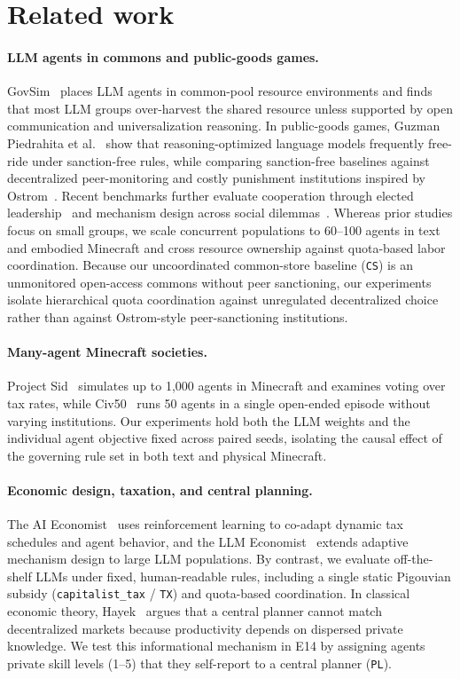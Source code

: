 \documentclass[10pt,letterpaper]{article}
\begin{document}
\section{Related work}

\paragraph{LLM agents in commons and public-goods games.}
GovSim~\cite{piatti2024} places LLM agents in common-pool resource environments and finds that most LLM groups over-harvest the shared resource unless supported by open communication and universalization reasoning. In public-goods games, Guzman Piedrahita et al.~\cite{guzman2025} show that reasoning-optimized language models frequently free-ride under sanction-free rules, while comparing sanction-free baselines against decentralized peer-monitoring and costly punishment institutions inspired by Ostrom~\cite{ostrom1990}. Recent benchmarks further evaluate cooperation through elected leadership~\cite{faulkner2026} and mechanism design across social dilemmas~\cite{tewolde2026}. Whereas prior studies focus on small groups, we scale concurrent populations to 60--100 agents in text and embodied Minecraft and cross resource ownership against quota-based labor coordination. Because our uncoordinated common-store baseline (\texttt{CS}) is an unmonitored open-access commons without peer sanctioning, our experiments isolate hierarchical quota coordination against unregulated decentralized choice rather than against Ostrom-style peer-sanctioning institutions.

\paragraph{Many-agent Minecraft societies.}
Project Sid~\cite{altera2024} simulates up to 1,000 agents in Minecraft and examines voting over tax rates, while Civ50~\cite{civ50} runs 50 agents in a single open-ended episode without varying institutions. Our experiments hold both the LLM weights and the individual agent objective fixed across paired seeds, isolating the causal effect of the governing rule set in both text and physical Minecraft.

\paragraph{Economic design, taxation, and central planning.}
The AI Economist~\cite{zheng2022} uses reinforcement learning to co-adapt dynamic tax schedules and agent behavior, and the LLM Economist~\cite{karten2025} extends adaptive mechanism design to large LLM populations. By contrast, we evaluate off-the-shelf LLMs under fixed, human-readable rules, including a single static Pigouvian subsidy (\texttt{capitalist\_tax} / \texttt{TX}) and quota-based coordination. In classical economic theory, Hayek~\cite{hayek1945} argues that a central planner cannot match decentralized markets because productivity depends on dispersed private knowledge. We test this informational mechanism in E14 by assigning agents private skill levels (1--5) that they self-report to a central planner (\texttt{PL}).
\end{document}
